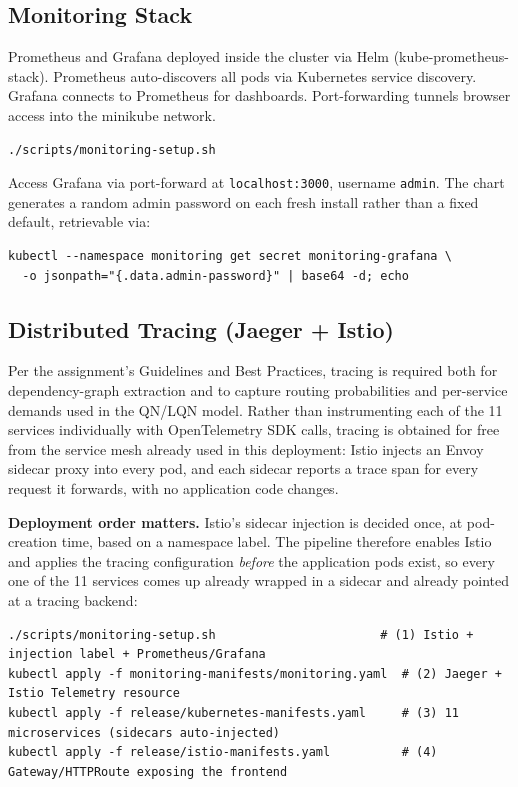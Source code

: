 \documentclass[12pt]{article}
\begin{document}
\subsection{Monitoring Stack}

Prometheus and Grafana deployed inside the cluster via Helm (kube-prometheus-stack). Prometheus auto-discovers all pods via Kubernetes service discovery. Grafana connects to Prometheus for dashboards. Port-forwarding tunnels browser access into the minikube network.

\begin{lstlisting}[style=plain]
./scripts/monitoring-setup.sh
\end{lstlisting}

Access Grafana via port-forward at \texttt{localhost:3000}, username \texttt{admin}. The chart generates a random admin password on each fresh install rather than a fixed default, retrievable via:

\begin{lstlisting}[style=plain]
kubectl --namespace monitoring get secret monitoring-grafana \
  -o jsonpath="{.data.admin-password}" | base64 -d; echo
\end{lstlisting}

\subsection{Distributed Tracing (Jaeger + Istio)}

Per the assignment's Guidelines and Best Practices, tracing is required both for dependency-graph extraction and to capture routing probabilities and per-service demands used in the QN/LQN model. Rather than instrumenting each of the 11 services individually with OpenTelemetry SDK calls, tracing is obtained for free from the service mesh already used in this deployment: Istio injects an Envoy sidecar proxy into every pod, and each sidecar reports a trace span for every request it forwards, with no application code changes.

\textbf{Deployment order matters.} Istio's sidecar injection is decided once, at pod-creation time, based on a namespace label. The pipeline therefore enables Istio and applies the tracing configuration \emph{before} the application pods exist, so every one of the 11 services comes up already wrapped in a sidecar and already pointed at a tracing backend:

\begin{lstlisting}[style=plain]
./scripts/monitoring-setup.sh                       # (1) Istio + injection label + Prometheus/Grafana
kubectl apply -f monitoring-manifests/monitoring.yaml  # (2) Jaeger + Istio Telemetry resource
kubectl apply -f release/kubernetes-manifests.yaml     # (3) 11 microservices (sidecars auto-injected)
kubectl apply -f release/istio-manifests.yaml          # (4) Gateway/HTTPRoute exposing the frontend
\end{lstlisting}
\end{document}
